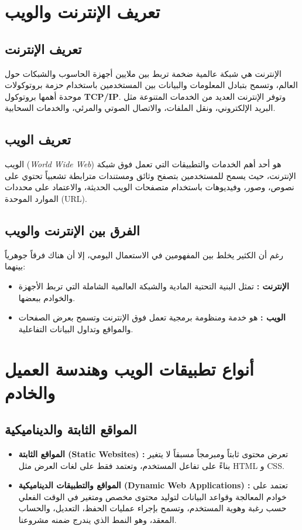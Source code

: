 \documentclass{bts-report-ar}
\begin{document}
\section{تعريف الإنترنت والويب}
\subsection{تعريف الإنترنت}
الإنترنت هي شبكة عالمية ضخمة تربط بين ملايين أجهزة الحاسوب والشبكات حول العالم، وتسمح بتبادل المعلومات والبيانات بين المستخدمين باستخدام حزمة بروتوكولات موحدة أهمها بروتوكول \textbf{TCP/IP}. وتوفر الإنترنت العديد من الخدمات المتنوعة مثل البريد الإلكتروني، ونقل الملفات، والاتصال الصوتي والمرئي، والخدمات السحابية.

\subsection{تعريف الويب}
الويب (\textit{World Wide Web}) هو أحد أهم الخدمات والتطبيقات التي تعمل فوق شبكة الإنترنت، حيث يسمح للمستخدمين بتصفح وثائق ومستندات مترابطة تشعبياً تحتوي على نصوص، وصور، وفيديوهات باستخدام متصفحات الويب الحديثة، والاعتماد على محددات الموارد الموحدة (URL).

\subsection{الفرق بين الإنترنت والويب}
رغم أن الكثير يخلط بين المفهومين في الاستعمال اليومي، إلا أن هناك فرقاً جوهرياً بينهما:
\begin{itemize}
  \item \textbf{الإنترنت :} تمثل البنية التحتية المادية والشبكة العالمية الشاملة التي تربط الأجهزة والخوادم ببعضها.
  \item \textbf{الويب :} هو خدمة ومنظومة برمجية تعمل فوق الإنترنت وتسمح بعرض الصفحات والمواقع وتداول البيانات التفاعلية.
\end{itemize}

\section{أنواع تطبيقات الويب وهندسة العميل والخادم}
\subsection{المواقع الثابتة والديناميكية}
\begin{itemize}
  \item \textbf{المواقع الثابتة (Static Websites) :} تعرض محتوى ثابتاً ومبرمجاً مسبقاً لا يتغير بناءً على تفاعل المستخدم، وتعتمد فقط على لغات العرض مثل HTML و CSS.
  \item \textbf{المواقع والتطبيقات الديناميكية (Dynamic Web Applications) :} تعتمد على خوادم المعالجة وقواعد البيانات لتوليد محتوى مخصص ومتغير في الوقت الفعلي حسب رغبة وهوية المستخدم، وتسمح بإجراء عمليات الحفظ، التعديل، والحساب المعقد، وهو النمط الذي يندرج ضمنه مشروعنا.
\end{itemize}
\end{document}
